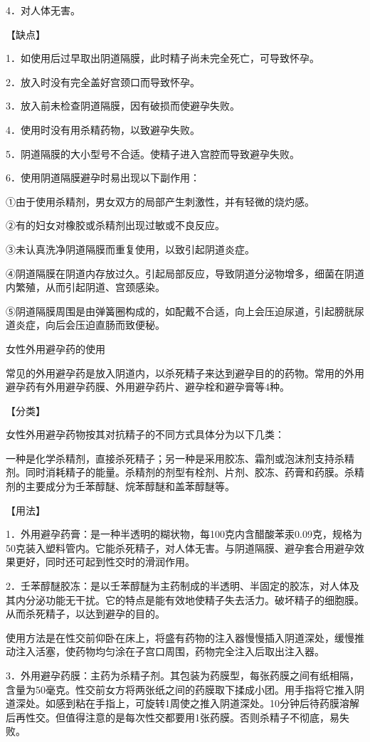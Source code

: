 \documentclass[12pt,UTF8,openany]{ctexbook}
\begin{document}
4．对人体无害。

【缺点】

1．如使用后过早取出阴道隔膜，此时精子尚未完全死亡，可导致怀孕。

2．放入时没有完全盖好宫颈口而导致怀孕。

3．放入前未检查阴道隔膜，因有破损而使避孕失败。

4．使用时没有用杀精药物，以致避孕失败。

5．阴道隔膜的大小型号不合适。使精子进入宫腔而导致避孕失败。

6．使用阴道隔膜避孕时易出现以下副作用：

①由于使用杀精剂，男女双方的局部产生刺激性，并有轻微的烧灼感。

②有的妇女对橡胶或杀精剂出现过敏或不良反应。

③未认真洗净阴道隔膜而重复使用，以致引起阴道炎症。

④阴道隔膜在阴道内存放过久。引起局部反应，导致阴道分泌物增多，细菌在阴道内繁殖，从而引起阴道、宫颈感染。

⑤阴道隔膜周围是由弹簧圈构成的，如配戴不合适，向上会压迫尿道，引起膀胱尿道炎症，向后会压迫直肠而致便秘。





女性外用避孕药的使用


常见的外用避孕药是放入阴道内，以杀死精子来达到避孕目的的药物。常用的外用避孕药有外用避孕药膜、外用避孕药片、避孕栓和避孕膏等4种。

【分类】

女性外用避孕药物按其对抗精子的不同方式具体分为以下几类：

一种是化学杀精剂，直接杀死精子；另一种是采用胶冻、霜剂或泡沫剂支持杀精剂。同时消耗精子的能量。杀精剂的剂型有栓剂、片剂、胶冻、药膏和药膜。杀精剂的主要成分为壬苯醇醚、烷苯醇醚和盖苯醇醚等。

【用法】

1．外用避孕药膏：是一种半透明的糊状物，每100克内含醋酸苯汞0.09克，规格为50克装入塑料管内。它能杀死精子，对人体无害。与阴道隔膜、避孕套合用避孕效果更好，同时还可起到性交时的滑润作用。

2．壬苯醇醚胶冻：是以壬苯醇醚为主药制成的半透明、半固定的胶冻，对人体及其内分泌功能无干扰。它的特点是能有效地使精子失去活力。破坏精子的细胞膜。从而杀死精子，以达到避孕的目的。

使用方法是在性交前仰卧在床上，将盛有药物的注入器慢慢插入阴道深处，缓慢推动注入活塞，使药物均匀涂在子宫口周围，药物完全注入后取出注入器。

3．外用避孕药膜：主药为杀精子剂。其包装为药膜型，每张药膜之间有纸相隔，含量为50毫克。性交前女方将两张纸之间的药膜取下揉成小团。用手指将它推入阴道深处。如感到粘在手指上，可旋转1周使之推入阴道深处。10分钟后待药膜溶解后再性交。但值得注意的是每次性交都要用1张药膜。否则杀精子不彻底，易失败。
\end{document}
